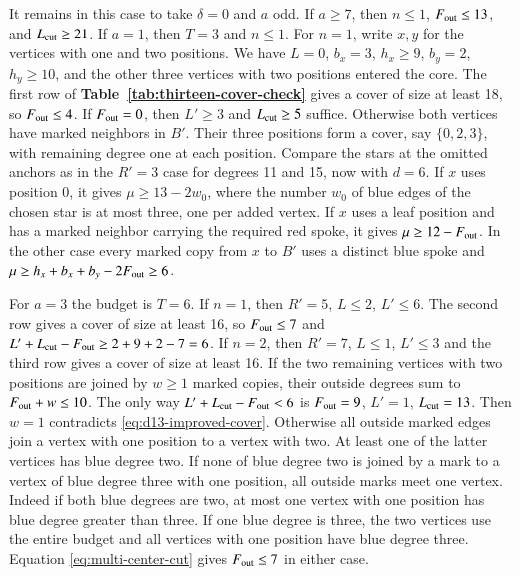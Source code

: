 It remains in this case to take $\delta=0$ and $a$ odd. If $a\ge7$,
then $n\le1$, $F_{\rm out}\le13$, and $L_{\rm cut}\ge21$.
If $a=1$, then $T=3$ and $n\le1$. For $n=1$, write $x,y$ for the
vertices with one and two positions. We have $L=0$, $b_x=3$,
$h_x\ge9$, $b_y=2$, $h_y\ge10$, and the other three vertices
with two positions entered the core. The first row of \textbf{Table~\ref{tab:thirteen-cover-check}}
gives a cover of size at least 18, so $F_{\rm out}\le4$. If
$F_{\rm out}=0$, then $L'\ge3$ and $L_{\rm cut}\ge5$ suffice.
Otherwise both vertices have marked neighbors in $B'$. Their three
positions form a cover, say $\{0,2,3\}$, with remaining degree one
at each position. Compare the stars at the omitted anchors as in the $R'=3$ case
for degrees 11 and 15, now with $d=6$. If $x$ uses position 0, it gives
$\mu\ge13-2w_0$, where the number $w_0$ of blue edges of the
chosen star is at most three, one per added vertex. If $x$ uses a
leaf position and has a marked neighbor carrying the required red
spoke, it gives $\mu\ge12-F_{\rm out}$. In the other case every
marked copy from $x$ to $B'$ uses a distinct blue spoke and
$\mu\ge h_x+b_x+b_y-2F_{\rm out}\ge6$.

For $a=3$ the budget is $T=6$. If $n=1$, then $R'=5$, $L\le2$,
$L'\le6$. The second row gives a cover of size at least 16, so
$F_{\rm out}\le7$ and $L'+L_{\rm cut}-F_{\rm out}\ge2+9+2-7=6$.
If $n=2$, then $R'=7$, $L\le1$, $L'\le3$ and the third row gives
a cover of size at least 16. If the two remaining vertices with two
positions are joined by $w\ge1$ marked copies, their outside degrees
sum to $F_{\rm out}+w\le10$. The only way
$L'+L_{\rm cut}-F_{\rm out}<6$ is $F_{\rm out}=9$, $L'=1$,
$L_{\rm cut}=13$. Then $w=1$ contradicts
\eqref{eq:d13-improved-cover}. Otherwise all outside marked edges
join a vertex with one position to a vertex with two. At least one
of the latter vertices has blue degree two. If none of blue degree
two is joined by a mark to a vertex of blue degree three with one
position, all outside marks meet one vertex. Indeed if both blue
degrees are two, at most one vertex with one position has blue
degree greater than three. If one blue degree is three, the two
vertices use the entire budget and all vertices with one position
have blue degree three. Equation \eqref{eq:multi-center-cut} gives
$F_{\rm out}\le7$ in either case.


